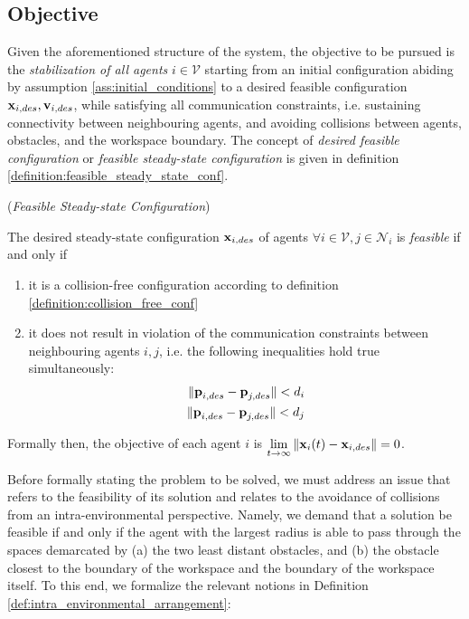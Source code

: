 \subsection{Objective}

Given the aforementioned structure of the system, the objective to be
pursued is the \textit{stabilization of all agents} $i \in \mathcal{V}$ starting
from an initial configuration abiding by assumption
\eqref{ass:initial_conditions} to a desired feasible configuration
$\bm{\mathbf{x}}_{i,des}, \bm{\mathbf{v}}_{i,des}$, while
satisfying all communication constraints, i.e. sustaining connectivity between
neighbouring agents, and avoiding collisions between agents, obstacles, and the
workspace boundary. The concept of \textit{desired feasible configuration}
or \textit{feasible steady-state configuration} is given in definition
\eqref{definition:feasible_steady_state_conf}.

\begin{bw_box}
\begin{definition} (\textit{Feasible Steady-state Configuration})
\label{definition:feasible_steady_state_conf}

The desired steady-state configuration $\bm{\mathbf{x}}_{i,des}$ of agents
$\forall i \in \mathcal{V}, j \in \mathcal{N}_i$ is \textit{feasible} if and
only if
\begin{enumerate}
  \item it is a collision-free configuration according to definition
    \eqref{definition:collision_free_conf}
  \item it does not result in violation of the communication constraints
    between neighbouring agents $i,j$, i.e. the following inequalities hold
    true simultaneously:
    \begin{align}
      \|\bm{\mathbf{p}}_{i,des} - \bm{\mathbf{p}}_{j,des}\| < d_i \\
      \|\bm{\mathbf{p}}_{i,des} - \bm{\mathbf{p}}_{j,des}\| < d_j \\
    \end{align}
\end{enumerate}

\end{definition}
\end{bw_box}

Formally then, the objective of each agent $i$ is
$\lim\limits_{t \to \infty} \|\bm{\mathbf{x}}_i(t) - \bm{\mathbf{x}}_{i,des}\| = 0$.

Before formally stating the problem to be solved, we must address an issue
that refers to the feasibility of its solution and relates to the avoidance of
collisions from an intra-environmental perspective. Namely, we demand that a
solution be feasible if and only if the agent with the largest radius is able to
pass through the spaces demarcated by (a) the two least distant obstacles,
and (b) the obstacle closest to the boundary of the workspace and the
boundary of the workspace itself. To this end, we formalize the relevant notions
in Definition \eqref{def:intra_environmental_arrangement}:

